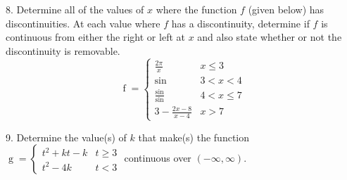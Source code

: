 \documentclass[12pt,]{book}
\newcommand{\lt}{<}
\newcommand{\gt}{>}
\theoremstyle{plain}
\theoremstyle{definition}
\numberwithin{equation}{section}
\newcounter{figstack}
\newcounter{figindex}
\newlength\fight
\newcommand\pushValignCaptionBottom[5][b]{%
\stepcounter{figstack}%
\expandafter\def\csname %
figalign\romannumeral\value{figstack}\endcsname{#1}%
\expandafter\def\csname %
figtype\romannumeral\value{figstack}\endcsname{#2}%
\expandafter\def\csname %
figwd\romannumeral\value{figstack}\endcsname{#3}%
\expandafter\def\csname %
figcontent\romannumeral\value{figstack}\endcsname{#4}%
\expandafter\def\csname %
figcap\romannumeral\value{figstack}\endcsname{#5}%
\setbox0=\hbox{%
\begin{#2}{#3}#4\end{#2}}%
\ifdim\dimexpr\ht0+\dp0\relax>\fight\global\setlength{\fight}{%
\dimexpr\ht0+\dp0\relax}\fi%
}
\newcommand\popValignCaptionBottom{%
\setcounter{figindex}{0}%
\hfill%
\whiledo{\value{figindex}<\value{figstack}}{%
\stepcounter{figindex}%
\def\tmp{\csname figwd\romannumeral\value{figindex}\endcsname}%
\begin{\csname figtype\romannumeral\value{figindex}\endcsname}[t]{\tmp}%
\centering%
\stackinset{c}{}%
{\csname figalign\romannumeral\value{figindex}\endcsname}{}%
{\csname figcontent\romannumeral\value{figindex}\endcsname}%
{\rule{0pt}{\fight}}\par%
\csname figcap\romannumeral\value{figindex}\endcsname%
\end{\csname figtype\romannumeral\value{figindex}\endcsname}%
\hfill%
}%
\setcounter{figstack}{0}%
\setlength{\fight}{0pt}%
\hfill%
}
\providecommand\phantomsection{}
\newcommand{\fe}[2]{\mathop{{#1}{\left(#2\right)}}}
\newcommand{\ointerval}[2]{\left(#1,#2\right)}
\begin{document}
\begin{exerciselist}
\par\smallskip
\item[8.]\phantomsection\hypertarget{exercise-145}{\null}Determine all of the values of \(x\) where the function \(f\) (given below) has discontinuities.  At each value where \(f\) has a discontinuity, determine if \(f\) is continuous from either the right or left at \(x\) and also state whether or not the discontinuity is removable.%
\[\fe{f}{x}=\begin{cases}\frac{2\pi}{x}&x\leq3\\\fe{\sin}{\frac{2\pi}{x}}&3\lt x\lt 4\\\frac{\fe{\sin}{x}}{\fe{\sin}{x}}&4\lt x\leq7\\3-\frac{2x-8}{x-4}&x\gt7\end{cases}\]\par\smallskip
\item[9.]\phantomsection\hypertarget{exercise-146}{\null}Determine the value(s) of \(k\) that make(s) the function \(\fe{g}{t}=\begin{cases}t^2+kt-k&t\geq3\\t^2-4k&t\lt 3\end{cases}\) continuous over \(\ointerval{-\infty}{\infty}\).%
\par\smallskip
\end{exerciselist}
\end{document}
